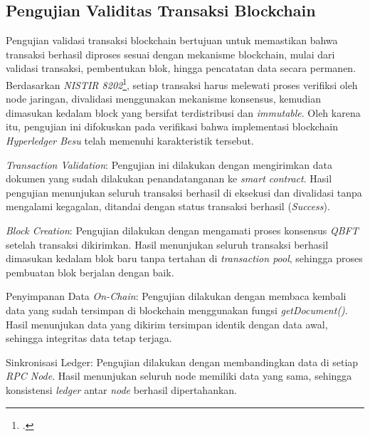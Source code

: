 




		\subsection{Pengujian Validitas Transaksi Blockchain}
		Pengujian validasi transaksi blockchain bertujuan untuk memastikan bahwa transaksi berhasil diproses sesuai dengan mekanisme blockchain, mulai dari validasi transaksi, pembentukan blok, hingga pencatatan data secara permanen. Berdasarkan \textit{NISTIR 8202}\footcite{Yaga2018}, setiap transaksi harus melewati proses verifiksi oleh node jaringan, divalidasi menggunakan mekanisme konsensus, kemudian dimasukan kedalam block yang bersifat terdistribusi dan \textit{immutable}. Oleh karena itu, pengujian ini difokuskan pada verifikasi bahwa implementasi blockchain \textit{Hyperledger Besu} telah memenuhi karakteristik tersebut.

		\begin{subsecenumerate}
			\item \textit{Transaction Validation}: Pengujian ini dilakukan dengan mengirimkan data dokumen yang sudah dilakukan penandatanganan ke \textit{smart contract}. Hasil pengujian menunjukan seluruh transaksi berhasil di eksekusi dan divalidasi tanpa mengalami kegagalan, ditandai dengan status transaksi berhasil (\textit{Success}).
			\item \textit{Block Creation}: Pengujian dilakukan dengan mengamati proses konsensus \textit{QBFT} setelah transaksi dikirimkan. Hasil menunjukan seluruh transaksi berhasil dimasukan kedalam blok baru tanpa tertahan di \textit{transaction pool}, sehingga proses pembuatan blok berjalan dengan baik.
			\item  Penyimpanan Data \textit{On-Chain}: Pengujian dilakukan dengan membaca kembali data yang sudah tersimpan di blockchain menggunakan fungsi \textit{getDocument()}. Hasil menunjukan data yang dikirim tersimpan identik dengan data awal, sehingga integritas data tetap terjaga.
			\item Sinkronisasi Ledger: Pengujian dilakukan dengan membandingkan data di setiap \textit{RPC Node}. Hasil menunjukan seluruh node memiliki data yang sama, sehingga
			konsistensi \textit{ledger} antar \textit{node} berhasil dipertahankan.  
		\end{subsecenumerate}

